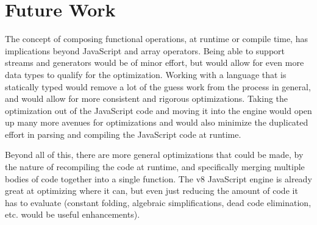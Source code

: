 \chapter{Future Work}

The concept of composing functional operations, at runtime or compile time, has implications beyond JavaScript and array operators. Being able to support streams and generators would be of minor effort, but would allow for even more data types to qualify for the optimization.  Working with a language that is statically typed would remove a lot of the guess work from the process in general, and would allow for more consistent and rigorous optimizations.  Taking the optimization out of the JavaScript code and moving it into the engine would open up many more avenues for optimizations and would also minimize the duplicated effort in parsing and compiling the JavaScript code at runtime.

Beyond all of this, there are more general optimizations that could be made, by the nature of recompiling the code at runtime, and specifically merging multiple bodies of code together into a single function.  The v8 JavaScript engine is already great at optimizing where it can, but even just reducing the amount of code it has to evaluate (constant folding, algebraic simplifications, dead code elimination, etc. would be useful enhancements).